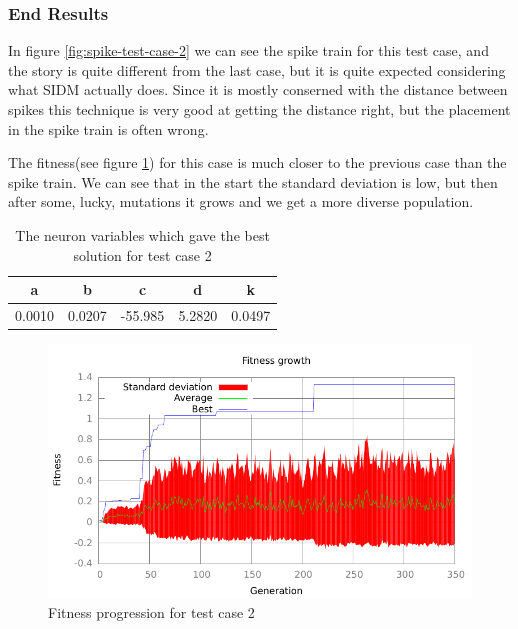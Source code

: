 \subsubsection{End Results}\label{sec:test-case-2-results}
In figure \ref{fig:spike-test-case-2} we can see the spike train for this test
case, and the story is quite different from the last case, but it is quite
expected considering what SIDM actually does. Since it is mostly conserned with
the distance between spikes this technique is very good at getting the distance
right, but the placement in the spike train is often wrong.

The fitness(see figure \ref{fig:fitness-test-case-2}) for this case is much 
closer to the previous case than the spike
train. We can see that in the start the standard deviation is low, but then
after some, lucky, mutations it grows and we get a more diverse population.
\begin{table}
	\begin{tabular}{c c c c c}
		a & b & c & d & k \\
		\hline
		0.0010 & 0.0207 & -55.985 & 5.2820 & 0.0497
	\end{tabular}
	\caption{The neuron variables which gave the best solution for test case
	2}
\end{table}
\begin{figure}[h]
	\centering
	\includegraphics{../output/sidm_izzy_1_fitness.pdf}
	\caption{Fitness progression for test case 2}
	\label{fig:fitness-test-case-2}
\end{figure}
